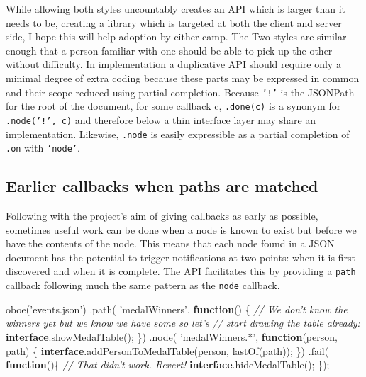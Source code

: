 \documentclass[]{article}
\newenvironment{Shaded}{}{}
\newcommand{\KeywordTok}[1]{\textcolor[rgb]{0.00,0.44,0.13}{\textbf{{#1}}}}
\newcommand{\StringTok}[1]{\textcolor[rgb]{0.25,0.44,0.63}{{#1}}}
\newcommand{\CommentTok}[1]{\textcolor[rgb]{0.38,0.63,0.69}{\textit{{#1}}}}
\newcommand{\FunctionTok}[1]{\textcolor[rgb]{0.02,0.16,0.49}{{#1}}}
\newcommand{\NormalTok}[1]{{#1}}
\begin{document}
While allowing both styles uncountably creates an API which is larger
than it needs to be, creating a library which is targeted at both the
client and server side, I hope this will help adoption by either camp.
The Two styles are similar enough that a person familiar with one should
be able to pick up the other without difficulty. In implementation a
duplicative API should require only a minimal degree of extra coding
because these parts may be expressed in common and their scope reduced
using partial completion. Because \texttt{'!'} is the JSONPath for the
root of the document, for some callback c, \texttt{.done(c)} is a
synonym for \texttt{.node('!', c)} and therefore below a thin interface
layer may share an implementation. Likewise, \texttt{.node} is easily
expressible as a partial completion of \texttt{.on} with
\texttt{'node'}.

\subsection{Earlier callbacks when paths are matched}

Following with the project's aim of giving callbacks as early as
possible, sometimes useful work can be done when a node is known to
exist but before we have the contents of the node. This means that each
node found in a JSON document has the potential to trigger notifications
at two points: when it is first discovered and when it is complete. The
API facilitates this by providing a \texttt{path} callback following
much the same pattern as the \texttt{node} callback.

\begin{Shaded}
\begin{Highlighting}[]
\FunctionTok{oboe}\NormalTok{(}\StringTok{'events.json'}\NormalTok{)}
   \NormalTok{.}\FunctionTok{path}\NormalTok{( }\StringTok{'medalWinners'}\NormalTok{, }\KeywordTok{function}\NormalTok{() \{}
      \CommentTok{// We don't know the winners yet but we know we have some so let's}
      \CommentTok{// start drawing the table already:    }
      \KeywordTok{interface}\NormalTok{.}\FunctionTok{showMedalTable}\NormalTok{();}
   \NormalTok{\})}
   \NormalTok{.}\FunctionTok{node}\NormalTok{( }\StringTok{'medalWinners.*'}\NormalTok{, }\KeywordTok{function}\NormalTok{(person, path) \{    }
      \KeywordTok{interface}\NormalTok{.}\FunctionTok{addPersonToMedalTable}\NormalTok{(person, }\FunctionTok{lastOf}\NormalTok{(path));}
   \NormalTok{\})}
   \NormalTok{.}\FunctionTok{fail}\NormalTok{( }\KeywordTok{function}\NormalTok{()\{}
      \CommentTok{// That didn't work. Revert!}
      \KeywordTok{interface}\NormalTok{.}\FunctionTok{hideMedalTable}\NormalTok{();}
   \NormalTok{\});}
\end{Highlighting}
\end{Shaded}
\end{document}
